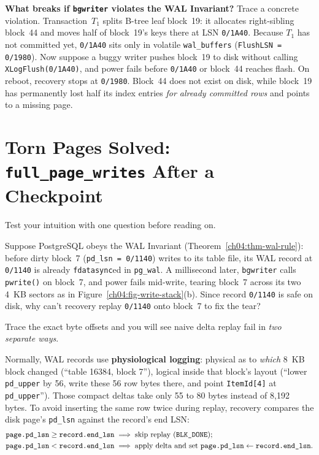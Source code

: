 \begin{attackbox}
\textbf{What breaks if \texttt{bgwriter} violates the WAL Invariant?}
Trace a concrete violation. Transaction~$T_1$ splits B-tree leaf block~19: it allocates right-sibling block~44 and moves half of block~19's keys there at LSN \texttt{0/1A40}. Because $T_1$ has not committed yet, \texttt{0/1A40} sits only in volatile \texttt{wal\_buffers} (\texttt{FlushLSN = 0/1980}). Now suppose a buggy writer pushes block~19 to disk without calling \texttt{XLogFlush(0/1A40)}, and power fails before \texttt{0/1A40} or block~44 reaches flash. On reboot, recovery stops at \texttt{0/1980}. Block~44 does not exist on disk, while block~19 has permanently lost half its index entries \emph{for already committed rows} and points to a missing page.
\end{attackbox}

\section{Torn Pages Solved: \texttt{full\_page\_writes} After a Checkpoint}
\label{ch04:fpw}

Test your intuition with one question before reading on.

\begin{walkbox}
Suppose PostgreSQL obeys the WAL Invariant (Theorem~\ref{ch04:thm-wal-rule}): before dirty block~7 (\texttt{pd\_lsn = 0/1140}) writes to its table file, its WAL record at \texttt{0/1140} is already \texttt{fdatasync}ed in \texttt{pg\_wal}. A millisecond later, \texttt{bgwriter} calls \texttt{pwrite()} on block~7, and power fails mid-write, tearing block~7 across its two 4~KB sectors as in Figure~\ref{ch04:fig-write-stack}(b). Since record \texttt{0/1140} is safe on disk, why can't recovery replay \texttt{0/1140} onto block~7 to fix the tear?
\end{walkbox}

Trace the exact byte offsets and you will see naive delta replay fail in \emph{two separate ways}.

Normally, WAL records use \textbf{physiological logging}: physical as to \emph{which} 8~KB block changed (``table 16384, block 7''), logical inside that block's layout (``lower \texttt{pd\_upper} by 56, write these 56 row bytes there, and point \texttt{ItemId[4]} at \texttt{pd\_upper}''). Those compact deltas take only 55 to 80 bytes instead of 8,192 bytes. To avoid inserting the same row twice during replay, recovery compares the disk page's \texttt{pd\_lsn} against the record's end LSN:
\begin{align*}
  \texttt{page.pd\_lsn} \ge \texttt{record.end\_lsn} &\implies \text{skip replay (\texttt{BLK\_DONE});}\\
  \texttt{page.pd\_lsn} < \texttt{record.end\_lsn} &\implies \text{apply delta and set } \texttt{page.pd\_lsn} \gets \texttt{record.end\_lsn}.
\end{align*}

